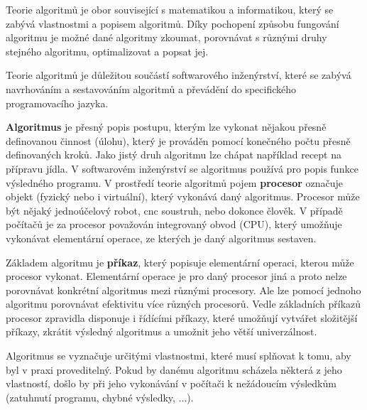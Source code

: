 %
%
%



%



\Obsah


Teorie algoritmů je obor související s matematikou a informatikou, který se zabývá vlastnostmi a popisem algoritmů. Díky pochopení způsobu fungování algoritmu je možné dané algoritmy zkoumat, porovnávat s různými druhy stejného algoritmu, optimalizovat a popsat jej.

Teorie algoritmů je důležitou součástí softwarového inženýrství, které se zabývá navrhováním a sestavováním algoritmů a převádění do specifického programovacího jazyka. 


{\bf Algoritmus} je přesný popis postupu, kterým lze vykonat nějakou přesně definovanou činnost (úlohu), který je prováděn pomocí konečného počtu přesně definovaných kroků. Jako jistý druh algoritmu lze chápat například recept na přípravu jídla. V softwarovém inženýrství se algoritmus používá pro popis funkce výsledného programu.
V prostředí teorie algoritmů pojem {\bf procesor} označuje objekt (fyzický nebo i virtuální), který vykonává daný algoritmus. Procesor může být nějaký jednoúčelový robot, cnc soustruh, nebo dokonce člověk. V případě počítačů je za procesor považován integrovaný obvod (CPU), který umožňuje vykonávat elementární operace, ze kterých je daný algoritmus sestaven. 

Základem algoritmu je {\bf příkaz}, který popisuje elementární operaci, kterou může procesor vykonat. Elementární operace je pro daný procesor jiná a proto nelze porovnávat konkrétní algoritmus mezi různými procesory. Ale lze pomocí jednoho algoritmu porovnávat efektivitu více různých procesorů. Vedle základních příkazů procesor zpravidla disponuje i řídícími příkazy, které umožňují vytvářet složitější příkazy, zkrátit výsledný algoritmus a umožnit jeho větší univerzálnost.


Algoritmus se vyznačuje určitými vlastnostmi, které musí splňovat k tomu, aby byl v praxi proveditelný. Pokud by danému algoritmu scházela některá z jeho vlastností, došlo by při jeho vykonávání v počítači k nežádoucím výsledkům (zatuhnutí programu, chybné výsledky, ...).

